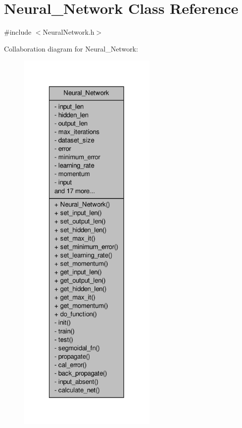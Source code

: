 \hypertarget{a00003}{\section{Neural\-\_\-\-Network Class Reference}
\label{d1/d7c/a00003}
}


{\ttfamily \#include $<$Neural\-Network.\-h$>$}



Collaboration diagram for Neural\-\_\-\-Network\-:
\nopagebreak
\begin{figure}[H]
\begin{center}
\leavevmode
\includegraphics[height=550pt]{d3/dea/a00046}
\end{center}
\end{figure}
